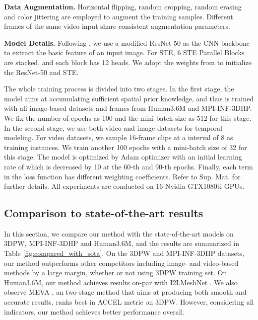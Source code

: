 \documentclass[10pt,twocolumn,letterpaper]{article}
\begin{document}
{{\textbf{Data Augmentation.} Horizontal flipping, random cropping, random erasing \cite{randomerase} and color jittering are employed to augment the training samples. 
Different frames of the same video input share consistent augmentation parameters. 




\textbf{Model Details.} Following \cite{vit}, we use a modified ResNet-50 \cite{resnet} as the CNN backbone to extract the basic feature of an input image.
For STE, 6 STE Parallel Blocks are stacked, and each block has 12 heads. We adopt the weights from \cite{vit} to initialize the ResNet-50 and STE.

The whole training process is divided into two stages. In the first stage, the model aims at accumulating sufficient spatial prior knowledge, and thus is trained with all image-based datasets and frames from Human3.6M and MPI-INF-3DHP.
We fix the number of epochs as 100 and the mini-batch size as 512 for this stage. In the second stage, we use both video and image datasets for temporal modeling. For video datasets, 
we sample 16-frame clips at a interval of 8 as training instances.
We train another 100 epochs with a mini-batch size of 32 for this stage. The model is optimized by Adam optimizer with an initial learning rate of  which is decreased by 10 at the 60-th and 90-th epochs. Finally, each term in the loss function has different weighting coefficients. Refer to Sup. Mat. for further details. All experiments are conducted on 16 Nvidia GTX1080ti GPUs.



\subsection{Comparison to state-of-the-art results}

In this section, we compare our method with the state-of-the-art models on 3DPW, MPI-INF-3DHP and Human3.6M, and the results are summarized in Table \ref{fig:compared_with_sota}. On the 3DPW and MPI-INF-3DHP datasets, our method outperforms other competitors including image- and video-based methods by a large margin, whether or not using 3DPW training set. On Human3.6M, our method achieves results on-par with I2LMeshNet \cite{I2LMeshNet}. We also observe MEVA \cite{meva}, an two-stage method that aims at producing both smooth and accurate results, ranks best in ACCEL metric on 3DPW. However, considering all indicators, our method achieves better performance overall.


}}
\end{document}
